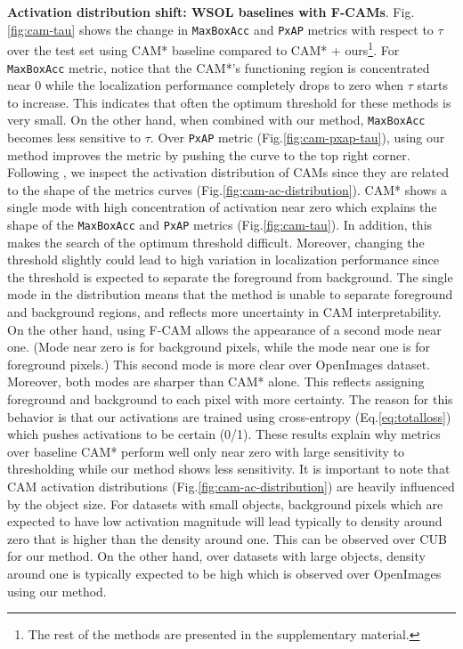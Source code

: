 \documentclass[twocolumn]{article}
\newcommand\maxboxacc{\texttt{MaxBoxAcc}\xspace}
\newcommand\pxap{\texttt{PxAP}\xspace}
\theoremstyle{definition}
\begin{document}
\noindent \textbf{Activation distribution shift: WSOL baselines with F-CAMs}. Fig.\ref{fig:cam-tau} shows the change in  \maxboxacc and \pxap metrics with respect to ${\tau}$ over the test set using CAM* baseline compared to CAM* + ours\footnote{The rest of the methods are presented in the supplementary material.}. For \maxboxacc metric, notice that the CAM*'s functioning region is concentrated near 0 while the localization performance completely drops to zero when ${\tau}$ starts to increase. This indicates that often the optimum threshold for these methods is very small. On the other hand, when combined with our method, \maxboxacc becomes less sensitive to ${\tau}$. Over \pxap metric (Fig.\ref{fig:cam-pxap-tau}), using our method improves the metric by pushing the curve to the top right corner.
Following \cite{choe2020evaluating}, we inspect the activation distribution of CAMs since they are related to  the shape of the metrics curves (Fig.\ref{fig:cam-ac-distribution}). CAM* shows a single mode with high concentration of activation near zero which explains the shape of the \maxboxacc and \pxap metrics (Fig.\ref{fig:cam-tau}). In addition, this makes the search of the optimum threshold difficult. Moreover, changing the threshold slightly could lead to high variation in localization performance since the threshold is expected to separate the foreground from background. The single mode in the distribution means that the method is unable to separate foreground and background regions, and reflects more uncertainty in CAM interpretability. On the other hand, using F-CAM allows the appearance of a second mode near one. (Mode near zero is for background pixels, while the mode near one is for foreground pixels.) This second mode is more clear over OpenImages dataset. Moreover, both modes are sharper than CAM* alone. This reflects assigning foreground and background to each pixel with more certainty. The reason for this behavior is that our activations are trained using  cross-entropy (Eq.\ref{eq:totalloss}) which pushes activations to be certain (0/1). These results explain why metrics over baseline CAM* perform well only near zero with large sensitivity to thresholding while our method shows less sensitivity.
It is important to note that CAM activation distributions (Fig.\ref{fig:cam-ac-distribution}) are  heavily influenced by the object size. For datasets with small objects, background pixels which are expected to have low activation magnitude will lead typically to density around zero that is higher than the density around one. This can be observed over CUB for our method. On the other hand, over datasets with large objects, density around one is typically expected to be high which is observed over OpenImages using our method.
\end{document}
